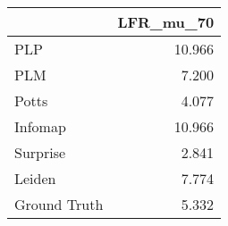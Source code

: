 \begin{tabular}{lr}
\toprule
{} & LFR_mu_70 \\
\midrule
PLP          &    10.966 \\
PLM          &     7.200 \\
Potts        &     4.077 \\
Infomap      &    10.966 \\
Surprise     &     2.841 \\
Leiden       &     7.774 \\
Ground Truth &     5.332 \\
\bottomrule
\end{tabular}
